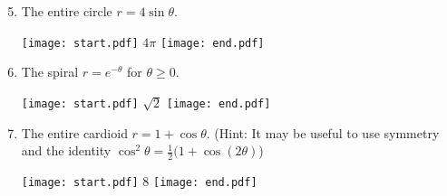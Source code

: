 \documentclass[12pt]{article}
\begin{document}

\begin{enumerate}
\setcounter{enumi}{4}

\item The entire circle $r=4\sin{\theta}$.

\texttt{[image: start.pdf]}
{{$4\pi$}}
\texttt{[image: end.pdf]}


\item The spiral $r=e^{-\theta}$ for $\theta \geq 0$.

\texttt{[image: start.pdf]}
{{$\sqrt{2}$}}
\texttt{[image: end.pdf]}


\item The entire cardioid $r=1+\cos{\theta}$. (Hint: It may be useful to use symmetry and the identity $\cos^2{\theta}=\frac{1}{2}(1+\cos{(2\theta)}$)

\texttt{[image: start.pdf]}
{{8}}
\texttt{[image: end.pdf]}


\end{enumerate}

\end{document}
